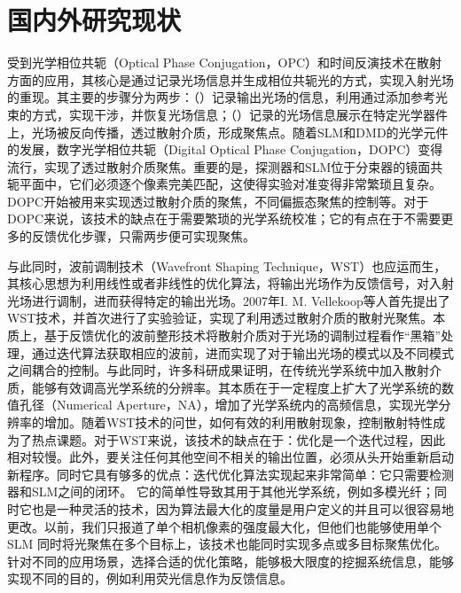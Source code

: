 \section{国内外研究现状}

受到光学相位共轭（Optical Phase Conjugation，OPC）和时间反演技术在散射方面的应用\cite{derode_robust_1995,draeger_one_channel_1997,leith_holographic_1966,fink_acoustic_2001}，其核心是通过记录光场信息并生成相位共轭光的方式，实现入射光场的重现。其主要的步骤分为两步：（）记录输出光场的信息，利用通过添加参考光束的方式，实现干涉，并恢复光场信息；（）记录的光场信息展示在特定光学器件上，光场被反向传播，透过散射介质，形成聚焦点。随着SLM和DMD的光学元件的发展，数字光学相位共轭（Digital Optical Phase Conjugation，DOPC）变得流行，实现了透过散射介质聚焦\cite{yaqoob_optical_2008,paurisse_phase_2009,cui_implementation_2010,lhermite_coherent_2010}。重要的是，探测器和SLM位于分束器的镜面共轭平面中，它们必须逐个像素完美匹配，这使得实验对准变得非常繁琐且复杂。DOPC开始被用来实现透过散射介质的聚焦，不同偏振态聚焦的控制等。对于DOPC来说，该技术的缺点在于需要繁琐的光学系统校准；它的有点在于不需要更多的反馈优化步骤，只需两步便可实现聚焦。

与此同时，波前调制技术（Wavefront Shaping Technique，WST）\cite{Vellekoop2007}也应运而生，其核心思想为利用线性或者非线性的优化算法，将输出光场作为反馈信号，对入射光场进行调制，进而获得特定的输出光场。2007年I. M. Vellekoop等人\cite{Vellekoop2007}首先提出了WST技术，并首次进行了实验验证，实现了利用透过散射介质的散射光聚焦。本质上，基于反馈优化的波前整形技术将散射介质对于光场的调制过程看作“黑箱”处理，通过迭代算法获取相应的波前，进而实现了对于输出光场的模式以及不同模式之间耦合的控制。与此同时，许多科研成果证明，在传统光学系统中加入散射介质，能够有效调高光学系统的分辨率\cite{vellekoop_exploiting_2010,choi_overcoming_2011}。其本质在于一定程度上扩大了光学系统的数值孔径（Numerical Aperture，NA），增加了光学系统内的高频信息，实现光学分辨率的增加。随着WST技术的问世，如何有效的利用散射现象，控制散射特性成为了热点课题。对于WST来说，该技术的缺点在于：优化是一个迭代过程，因此相对较慢。此外，要关注任何其他空间不相关的输出位置，必须从头开始重新启动新程序。同时它具有够多的优点：迭代优化算法实现起来非常简单：它只需要检测器和SLM之间的闭环。 它的简单性导致其用于其他光学系统，例如多模光纤；同时它也是一种灵活的技术，因为算法最大化的度量是用户定义的并且可以很容易地更改。以前，我们只报道了单个相机像素的强度最大化，但他们也能够使用单个 SLM 同时将光聚焦在多个目标上，该技术也能同时实现多点或多目标聚焦优化。针对不同的应用场景，选择合适的优化策略，能够极大限度的挖掘系统信息，能够实现不同的目的，例如利用荧光信息作为反馈信息\cite{boniface_non_invasive_2019}。

